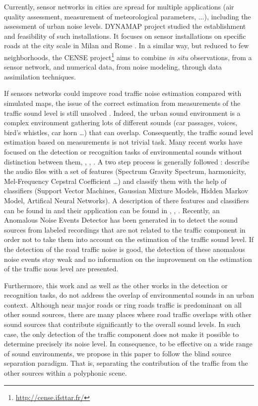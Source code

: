 \documentclass[twocolumn,a4paper,10pt]{article}
\begin{document}
Currently, sensor networks in cities are spread for multiple applications (air quality assessment, measurement of meteorological parameters, ...), including the assessment of urban noise levels. DYNAMAP project \cite{dynamap_2016} studied the establishment and feasibility of such installations. It focuses on sensor installations on specific roads at the city scale in Milan and Rome \cite{bellucci_life_2017}. In a similar way, but reduced to few neighborhoods, the CENSE project\footnote{\url{http://cense.ifsttar.fr/}} \cite{picaut2017characterization} aims to combine \textit{in situ} observations, from a sensor network, and numerical data, from noise modeling, through data assimilation techniques.

If sensors networks could improve road traffic noise estimation compared with simulated maps, the issue of the correct estimation from  measurements of the traffic sound level is still unsolved \cite{Mioduszewski}. Indeed, the urban sound environment is a complex environment gathering lots of different sounds (car passages, voices, bird's whistles, car horn \dots) that can overlap. Consequently, the traffic sound level estimation based on measurements is not trivial task.
Many recent works have focused on the detection or recognition tasks of environmental sounds without distinction between them\cite{heittola_sound_2011}, \cite{defreville_automatic_2006}, \cite{dufaux_automatic_2000}, \cite{chu_environmental_2009}. A two step process is generally followed : describe the audio files with a set of features (Spectrum Gravity Spectrum, harmonicity, Mel-Frequency Cepstral Coefficient \dots) and classify them with the help of classifiers (Support Vector Machines, Gaussian Mixture Models, Hidden Markov Model, Artifical Neural Networks). A description of there features and classifiers can be found in \cite{cowling_comparison_2003} and their application can be found in \cite{shen_environmental_2012}, \cite{beritelli_pattern_2008}, \cite{couvreur_automatic_2004}. Recently, an Anomalous Noise Events Detector has been generated in \cite{socoro_anomalous_2017} to detect the sound sources from labeled recordings that are not related to the traffic component in order not to take them into account on the estimation of the traffic sound level. If the detection of the road traffic noise is good, the detection of these anomalous noise events stay weak and no information on the improvement on the estimation of the traffic nous level are presented.

Furthermore, this work and as well as the other works in the detection or recognition tasks, do not address the overlap of environmental sounds in an urban context. Although near major roads or ring roads traffic is predominant on all other sound sources, there are many places where road traffic overlaps with other sound sources that contribute significantly to the overall sound levels. In such case, the only detection of the traffic component does not make it possible to determine precisely its noise level. In consequence, to be effective on a wide range of sound environments, we propose in this paper to follow the blind source separation paradigm. That is, separating the contribution of the traffic from the other sources within a polyphonic scene.
\end{document}
